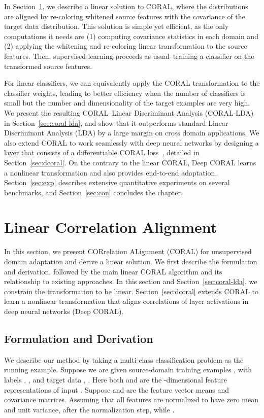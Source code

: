 \documentclass[graybox]{svmult}
\begin{document}
In Section~\ref{sec:coral}, we describe a linear solution to CORAL, where the distributions are aligned by re-coloring whitened source features with the covariance of the target data distribution. This solution is simple yet efficient, as the only computations it needs are (1) computing covariance statistics in each domain and (2) applying the whitening and re-coloring linear transformation to the source features. Then, supervised learning proceeds as usual--training a classifier on the transformed source features. 

For linear classifiers, we can equivalently apply the CORAL transformation to the classifier weights, leading to better efficiency when the number of classifiers is small but the number and dimensionality of the target examples are very high. We present the resulting CORAL--Linear Discriminant Analysis (CORAL-LDA)~\cite{coral-lda} in Section~\ref{sec:coral-lda}, and show that it outperforms standard Linear Discriminant Analysis (LDA) by a large margin on cross domain applications. We also extend CORAL to work seamlessly with deep neural networks by designing a layer that consists of a differentiable CORAL loss~\cite{dcoral}, detailed in Section~\ref{sec:dcoral}. On the contrary to the linear CORAL, Deep CORAL learns a nonlinear transformation and also provides end-to-end adaptation. Section~\ref{sec:exp} describes extensive quantitative experiments on several benchmarks, and Section~\ref{sec:con} concludes the chapter. \section{Linear Correlation Alignment}
\label{sec:coral}

In this section, we present CORrelation ALignment (CORAL) for unsupervised domain adaptation and derive a linear solution. We first describe the formulation and derivation, followed by the main linear CORAL algorithm and its relationship to existing approaches. In this section and Section~\ref{sec:coral-lda}, we constrain the transformation to be linear. Section~\ref{sec:dcoral} extends CORAL to learn a nonlinear transformation that aligns correlations of layer activations in deep neural networks (Deep CORAL).

\subsection{Formulation and Derivation}
We describe our method by taking a multi-class classification problem as the running example. Suppose we are given source-domain training examples ,  with labels , , and target data , . Here both  and  are the -dimensional feature representations  of input . Suppose  and  are the feature vector means and covariance matrices. Assuming that all features are normalized to have zero mean and unit variance,  after the normalization step, while .
\end{document}
